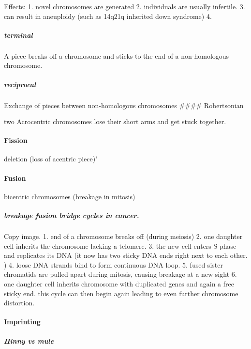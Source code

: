 \documentclass[]{article}
\let\oldparagraph\paragraph
\renewcommand{\paragraph}[1]{\oldparagraph{#1}\mbox{}}
\let\oldsubparagraph\subparagraph
\renewcommand{\subparagraph}[1]{\oldsubparagraph{#1}\mbox{}}
\begin{document}
Effects: 1. novel chromosomes are generated 2. individuals are usually
infertile. 3. can result in aneuploidy (such as 14q21q inherited down
syndrome) 4.

\hypertarget{terminal}{%
\subparagraph{terminal}\label{terminal}}

A piece breaks off a chromosome and sticks to the end of a
non-homologous chromosome.

\hypertarget{reciprocal}{%
\subparagraph{reciprocal}\label{reciprocal}}

Exchange of pieces between non-homologous chromosomes \#\#\#\#
Robertsonian

two Acrocentric chromosomes lose their short arms and get stuck
together.

\hypertarget{fission}{%
\paragraph{Fission}\label{fission}}

deletion (loss of acentric piece)'

\hypertarget{fusion}{%
\paragraph{Fusion}\label{fusion}}

bicentric chromosomes (breakage in mitosis)

\hypertarget{breakage-fusion-bridge-cycles-in-cancer.}{%
\subparagraph{breakage fusion bridge cycles in
cancer.}\label{breakage-fusion-bridge-cycles-in-cancer.}}

Copy image. 1. end of a chromosome breaks off (during meiosis) 2. one
daughter cell inherits the chromosome lacking a telomere. 3. the new
cell enters S phase and replicates its DNA (it now has two sticky DNA
ends right next to each other. ) 4. loose DNA strands bind to form
continuous DNA loop. 5. fused sister chromatids are pulled apart during
mitosis, causing breakage at a new sight 6. one daughter cell inherits
chromosome with duplicated genes and again a free sticky end. this cycle
can then begin again leading to even further chromosome distortion.

\hypertarget{imprinting}{%
\paragraph{Imprinting}\label{imprinting}}

\hypertarget{hinny-vs-mule}{%
\subparagraph{Hinny vs mule}\label{hinny-vs-mule}}
\end{document}
